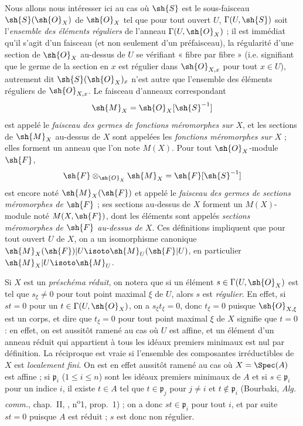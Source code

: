 \begin{env}[20.1.3]
Nous allons nous intéresser ici au cas où $\sh{S}$ est le sous-faisceau $\sh{S}(\sh{O}_X)$ de $\sh{O}_X$ tel que pour tout ouvert $U$, $\Gamma(U,\sh{S})$ soit l'\emph{ensemble des éléments réguliers} de l'anneau $\Gamma(U,\sh{O}_X)$ ; il est immédiat qu'il s'agit d'un faisceau (et non seulement d'un préfaisceau), la régularité d'une section de $\sh{O}_X$ au-dessus de $U$ se vérifiant « fibre par fibre » (i.e. signifiant que le germe de la section en $x$ est régulier dans $\sh{O}_{X,x}$ pour tout $x\in U$), autrement dit $\sh{S}(\sh{O}_X)_x$ n'est autre que l'ensemble des éléments réguliers de $\sh{O}_{X,x}$.
Le faisceau d'anneaux correspondant
\[
  \sh{M}_X=\sh{O}_X[\sh{S}^{-1}]
\]
est appelé le \emph{faisceau des germes de fonctions méromorphes sur $X$}, et les sections de $\sh{M}_X$ au-dessus de $X$ sont appelées les \emph{fonctions méromorphes sur $X$} ; elles forment un anneau que l'on note $M(X)$.
Pour tout $\sh{O}_X$-module $\sh{F}$,
\[
  \sh{F}\otimes_{\sh{O}_X}\sh{M}_X=\sh{F}[\sh{S}^{-1}]
\]
est encore noté $\sh{M}_X(\sh{F})$ et appelé le \emph{faisceau des germes de sections méromorphes de $\sh{F}$} ; ses sections au-dessus de $X$ forment un $M(X)$-module noté $M(X,\sh{F})$, dont les éléments sont appelés \emph{sections méromorphes de $\sh{F}$ au-dessus de $X$}.
Ces définitions impliquent que pour tout ouvert $U$ de $X$, on a un isomorphisme canonique $\sh{M}_X(\sh{F})|U\isoto\sh{M}_U(\sh{F}|U)$, en particulier $\sh{M}_X|U\isoto\sh{M}_U$.
\end{env}

\begin{env}[20.1.3.1]
\label{IV.20.1.3.1}
Si $X$ est un \emph{préschéma réduit}, on notera que si un élément $s\in\Gamma(U,\sh{O}_X)$ est tel que $s_\xi\neq0$ pour tout point maximal $\xi$ de $U$, alors $s$ est \emph{régulier}.
En effet, si $st=0$ pour un $t\in\Gamma(U,\sh{O}_X)$, on a $s_\xi t_\xi=0$, donc $t_\xi=0$ puisque $\sh{O}_{X,\xi}$ est un corps, et dire que $t_\xi=0$ pour tout point maximal $\xi$ de $X$ signifie que $t=0$ : en effet, on est aussitôt ramené au cas où $U$ est affine, et un élément d'un anneau réduit qui appartient à tous les idéaux premiers minimaux est nul par définition.
La réciproque est vraie si l'ensemble des composantes irréductibles de $X$ est \emph{localement fini}.
On est en effet aussitôt ramené au cas où $X=\Spec(A)$ est affine ; si $\mathfrak p_i$ ($1\leq i\leq n$) sont les idéaux premiers minimaux de $A$ et si $s\in\mathfrak p_i$ pour un indice $i$, il existe $t\in A$ tel que $t\in\mathfrak p_j$ pour $j\neq i$ et $t\notin\mathfrak p_i$ (Bourbaki, \emph{Alg. comm.}, chap.~II, , n\textsuperscript{o}1, prop.~1) ; on a donc $st\in\mathfrak p_i$ pour tout $i$, et par suite $st=0$ puisque $A$ est réduit ; $s$ est donc non régulier.
\end{env}

